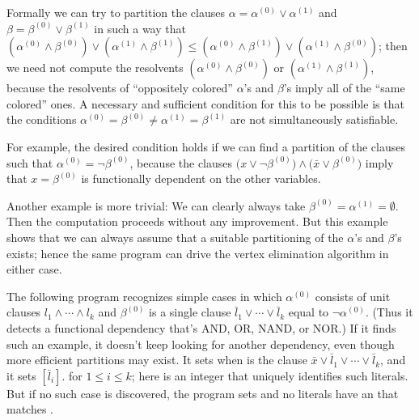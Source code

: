 Formally we can try to partition the
clauses $\alpha=\alpha^{(0)}\lor\alpha^{(1)}$ and
$\beta=\beta^{(0)}\lor\beta^{(1)}$ in such a way that
$(\alpha^{(0)}\land\beta^{(0)})\lor
(\alpha^{(1)}\land\beta^{(1)})\le
(\alpha^{(0)}\land\beta^{(1)})\lor
(\alpha^{(1)}\land\beta^{(0)})$;
then we need not compute the resolvents
$(\alpha^{(0)}\land\beta^{(0)})$ or
$(\alpha^{(1)}\land\beta^{(1)})$, because the resolvents of ``oppositely
colored'' $\alpha$'s and $\beta$'s imply all of the ``same colored'' ones.
A necessary and sufficient condition for this to be possible is that
the conditions $\alpha^{(0)}=\beta^{(0)}\ne\alpha^{(1)}=\beta^{(1)}$
are not simultaneously satisfiable.

For example, the desired condition holds if we can find
a partition of the clauses such that $\alpha^{(0)}=\lnot\beta^{(0)}$,
because the clauses $\bigl(x\lor\lnot\beta^{(0)}\bigr)
\land\bigl(\bar x\lor\beta^{(0)}\bigr)$ imply that $x=\beta^{(0)}$
is functionally dependent on the other variables.

Another example is more trivial: We can clearly always take $\beta^{(0)}=
\alpha^{(1)}=\emptyset$. Then the computation proceeds without any improvement.
But this example shows that we can always assume that a suitable partitioning
of the $\alpha$'s and $\beta$'s exists; hence the same program
can drive the vertex elimination algorithm in either case.

The following program recognizes simple cases in which
$\alpha^{(0)}$ consists of unit clauses $l_1\land\cdots\land l_k$
and $\beta^{(0)}$ is a single clause $\bar l_1\lor\cdots\lor\bar l_k$
equal to $\lnot\alpha^{(0)}$. (Thus it detects a functional
dependency that's {\mc AND}, {\mc OR}, {\mc NAND}, or {\mc NOR}.)
If it finds such an example,
it doesn't keep looking for another dependency, even though
more efficient partitions may exist. It sets  when
 is the clause $\bar x\lor\bar l_1\lor\cdots\lor\bar l_k$,
and it sets $[\bar l_i]$. for $1\le i%
\le k$;
here  is an integer that uniquely identifies such literals.
But if no such case is discovered, the program sets  and
no literals have an  that matches .

